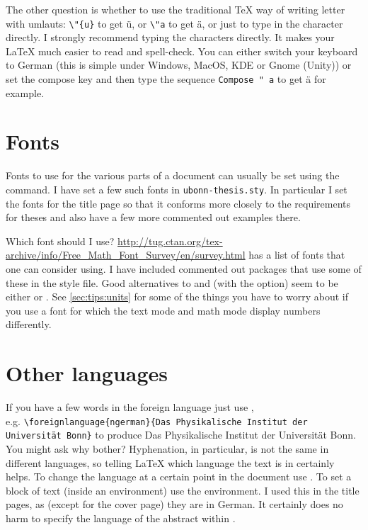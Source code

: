 The other question is whether to use the traditional \TeX{} way of
writing letter with umlauts: \verb+\"{u}+ to get \"{u}, or \verb+\"a+
to get \"a, or just to type in the character directly. I strongly
recommend typing the characters directly. It makes your \LaTeX{} much
easier to read and spell-check. You can either switch your keyboard to
German (this is simple under Windows, MacOS, KDE or Gnome (Unity)) or set the
compose key and then type the sequence \texttt{Compose " a} to get ä for example. %


\section{Fonts}%
\label{sec:layout:font}

Fonts to use for the various parts of a
document can usually be set using the  command. I
have set a few such fonts in \texttt{ubonn-thesis.sty}. In particular
I set the fonts for the title page so that it conforms more closely to
the requirements for theses and also have a few more commented out
examples there.

Which font should I use?
\url{http://tug.ctan.org/tex-archive/info/Free_Math_Font_Survey/en/survey.html}
has a list of fonts that one can consider using.
I have included
commented out packages that use some of these in the style file.
Good alternatives to  and  (with the  option) seem
to be either  or .
See \cref{sec:tips:units} for some of the things you have to worry
about if you use a font for which the text mode and math mode display
numbers differently.

\section{Other languages}%
\label{sec:layout:lang}

If you have a few words in the foreign language just use
,\\
e.g. \texttt{\textbackslash foreignlanguage\{ngerman\}\{Das
  Physikalische Institut der Universität Bonn\}}  to produce \foreignlanguage{ngerman}{Das
  Physikalische Institut der Universität Bonn}. You might ask why
bother? Hyphenation, in particular, is not the same in different
languages, so telling \LaTeX{} which language the text is in certainly
helps. To change the language at a certain point in the document use
. To set a block of text (inside an environment)
use the  environment. I used this in the title
pages, as (except for the cover page) they are in German. It certainly
does no harm to specify the language of the abstract
within .

